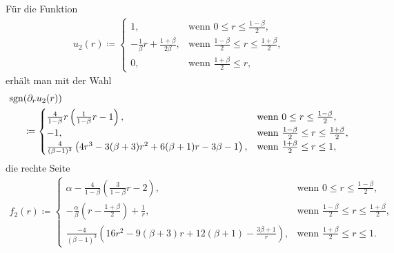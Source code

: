 Für die Funktion
\begin{align*}
  u_2(r)\coloneqq 
  \begin{cases}
    1, & \text{wenn } 0\leq r\leq\frac{1-\beta}{2},\\
    -\frac{1}{\beta}r + \frac{1+\beta}{2\beta}, & 
    \text{wenn } \frac{1-\beta}{2}\leq r\leq \frac{1+\beta}{2},\\
    0, & \text{wenn } \frac{1+\beta}{2}\leq r,
  \end{cases}
\end{align*}
erhält man mit der Wahl
\begin{align*}
  \operatorname{sgn}&(\partial_r u_2(r)) \\
  &\coloneqq 
  \begin{cases}
    \frac{4}{1-\beta}r\left(\frac{1}{1-\beta}r -1\right), &
    \text{wenn } 0\leq r\leq\frac{1-\beta}{2},\\
    -1, & \text{wenn } \frac{1-\beta}{2}\leq r\leq \frac{1+\beta}{2},\\
    \frac{4}{(\beta-1)^3}
    \left( 4r^3-3(\beta+3)r^2 +6(\beta+1)r-3\beta-1\right), & 
    \text{wenn } \frac{1+\beta}{2}\leq r\leq 1,
  \end{cases}
\end{align*}
die rechte Seite
\begin{align*}
  f_2(r)\coloneqq 
  \begin{cases}
    \alpha - \frac{4}{1-\beta}\left(\frac{3}{1-\beta}r - 2\right), &
    \text{wenn } 0\leq r\leq\frac{1-\beta}{2},\\
    -\frac{\alpha}{\beta}\left( r-\frac{1+\beta}{2} \right) +\frac{1}{r}, & 
    \text{wenn } \frac{1-\beta}{2}\leq r\leq \frac{1+\beta}{2},\\
    \frac{-4}{(\beta-1)^3}
    \left( 16r^2 -9(\beta+3)r + 12(\beta+1) - \frac{3\beta+1}{r}\right), & 
    \text{wenn } \frac{1+\beta}{2}\leq r\leq 1.
  \end{cases}
\end{align*}

